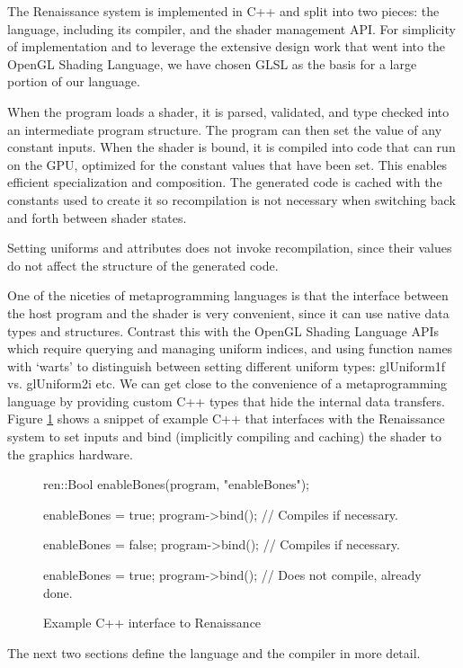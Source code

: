 \documentclass[review]{acmsiggraph}      %
\begin{document}
The Renaissance system is implemented in C++ and split into two
pieces: the language, including its compiler, and the shader
management API.  For simplicity of implementation and to leverage the
extensive design work that went into the OpenGL Shading Language, we
have chosen GLSL as the basis for a large portion of our language.

When the program loads a shader, it is parsed, validated, and type
checked into an intermediate program structure.  The program can then
set the value of any constant inputs.  When the shader is bound, it is
compiled into code that can run on the GPU, optimized for the constant
values that have been set.  This enables efficient specialization and
composition.  The generated code is cached with the constants used to
create it so recompilation is not necessary when switching back and
forth between shader states.

Setting uniforms and attributes does not invoke recompilation, since
their values do not affect the structure of the generated code.

One of the niceties of metaprogramming languages is that the interface
between the host program and the shader is very convenient, since it
can use native data types and structures.  Contrast this with the
OpenGL Shading Language APIs which require querying and managing
uniform indices, and using function names with `warts' to distinguish
between setting different uniform types: glUniform1f vs. glUniform2i
etc.  We can get close to the convenience of a metaprogramming
language by providing custom C++ types that hide the internal data
transfers.  Figure \ref{InterfaceCode} shows a snippet of example C++
that interfaces with the Renaissance system to set inputs and bind
(implicitly compiling and caching) the shader to the graphics
hardware.

\begin{figure}
\begin{MyVerb}
ren::Bool enableBones(program, "enableBones");

enableBones = true;
program->bind();  // Compiles if necessary.

enableBones = false;
program->bind();  // Compiles if necessary.

enableBones = true;
program->bind();  // Does not compile, already done.
\end{MyVerb}
\caption{Example C++ interface to Renaissance}
\label{InterfaceCode}
\end{figure}

The next two sections define the language and the compiler in more detail.
\end{document}
